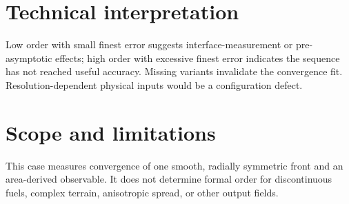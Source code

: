 \section{Technical interpretation}

Low order with small finest error suggests interface-measurement or pre-asymptotic effects; high order with excessive finest error indicates the sequence has not reached useful accuracy. Missing variants invalidate the convergence fit. Resolution-dependent physical inputs would be a configuration defect.

\section{Scope and limitations}

This case measures convergence of one smooth, radially symmetric front and an area-derived observable. It does not determine formal order for discontinuous fuels, complex terrain, anisotropic spread, or other output fields.

